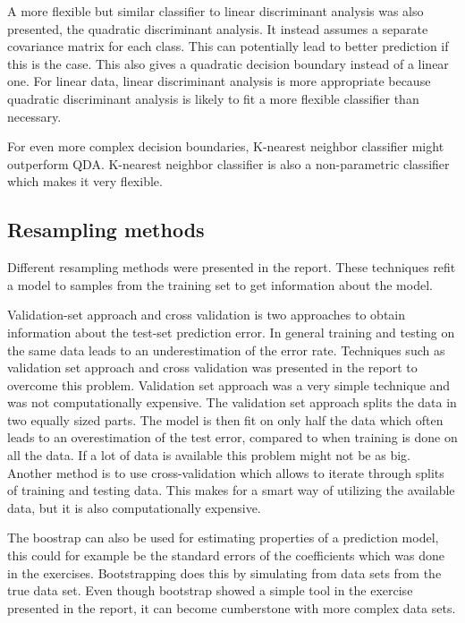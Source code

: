 A more flexible but similar classifier to linear discriminant analysis was also presented, the quadratic discriminant analysis. It instead assumes a separate covariance matrix for each class. This can potentially lead to better prediction if this is the case. This also gives a quadratic decision boundary instead of a linear one. For linear data, linear discriminant analysis is more appropriate because quadratic discriminant analysis is likely to fit a more flexible classifier than necessary.

For even more complex decision boundaries, K-nearest neighbor classifier might outperform QDA. K-nearest neighbor classifier is also a non-parametric classifier which makes it very flexible.

\subsection{Resampling methods}
Different resampling methods were presented in the report. These techniques refit a model to samples from the training set to get information about the model. 

Validation-set approach and cross validation is two approaches to obtain information about the test-set prediction error. In general training and testing on the same data leads to an underestimation of the error rate. Techniques such as validation set approach and cross validation was presented in the report to overcome this problem. Validation set approach was a very simple technique and was not computationally expensive. The validation set approach splits the data in two equally sized parts. The model is then fit on only half the data which often leads to an overestimation of the test error, compared to when training is done on all the data. If a lot of data is available this problem might not be as big. Another method is to use cross-validation which allows to iterate through splits of training and testing data. This makes for a smart way of utilizing the available data, but it is also computationally expensive.

The boostrap can also be used for estimating properties of a prediction model, this could for example be the standard errors of the coefficients which was done in the exercises. Bootstrapping does this by simulating from data sets from the true data set. Even though bootstrap showed a simple tool in the exercise presented in the report, it can become cumberstone with more complex data sets.

